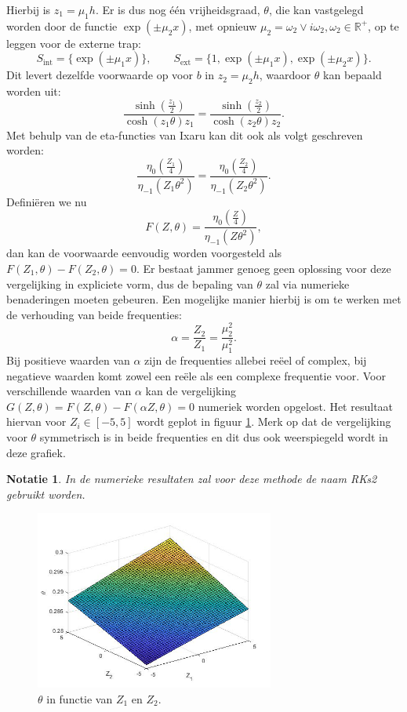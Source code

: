 \documentclass[12pt]{article}
\newtheorem{nta}[defn]{Notatie}
\begin{document}
Hierbij is \(z_1=\mu_1h\). Er is dus nog één vrijheidsgraad, \(\theta\), die kan vastgelegd worden door de functie \(\exp(\pm\mu_2x)\), met opnieuw \(\mu_2=\omega_2\vee i\omega_2,\omega_2\in\mathbb{R}^+\), op te leggen voor de externe trap:
\[S_{\textrm{int}}=\{\exp(\pm\mu_1x)\},\qquad S_{\textrm{ext}}=\{1,\exp(\pm\mu_1x),\exp(\pm\mu_2x)\}.\]
Dit levert dezelfde voorwaarde op voor \(b\) in \(z_2=\mu_2h\), waardoor \(\theta\) kan bepaald worden uit:
\[\frac{\sinh(\frac{z_1}{2})}{\cosh(z_1\theta)z_1}=\frac{\sinh(\frac{z_2}{2})}{\cosh(z_2\theta)z_2}.\]
Met behulp van de eta-functies van Ixaru kan dit ook als volgt geschreven worden:
\begin{equation} \label{eq:thetaeq}
    \frac{\eta_0(\frac{Z_1}{4})}{\eta_{-1}(Z_1\theta^2)}=\frac{\eta_0(\frac{Z_2}{4})}{\eta_{-1}(Z_2\theta^2)}.
\end{equation}
Definiëren we nu
\[F(Z,\theta)=\frac{\eta_0(\frac{Z}{4})}{\eta_{-1}(Z\theta^2)},\]
dan kan de voorwaarde eenvoudig worden voorgesteld als \(F(Z_1,\theta)-F(Z_2,\theta)=0\). Er bestaat jammer genoeg geen oplossing voor deze vergelijking in expliciete vorm, dus de bepaling van \(\theta\) zal via numerieke benaderingen moeten gebeuren. Een mogelijke manier hierbij is om te werken met de verhouding van beide frequenties:
\[\alpha=\frac{Z_2}{Z_1}=\frac{\mu_2^2}{\mu_1^2}.\]
Bij positieve waarden van \(\alpha\) zijn de frequenties allebei reëel of complex, bij negatieve waarden komt zowel een reële als een complexe frequentie voor. Voor verschillende waarden van \(\alpha\) kan de vergelijking \(G(Z,\theta)=F(Z,\theta)-F(\alpha Z,\theta)=0\) numeriek worden opgelost. Het resultaat hiervan voor \(Z_i\in[-5,5]\) wordt geplot in figuur \ref{fig:thetagraph}. Merk op dat de vergelijking voor \(\theta\) symmetrisch is in beide frequenties en dit dus ook weerspiegeld wordt in deze grafiek.
\begin{nta}
In de numerieke resultaten zal voor deze methode de naam RKs2 gebruikt worden.
\end{nta}
\begin{figure}[H]
    \centering
    \includegraphics[width=0.7\textwidth]{thetagraph.jpg}
    \caption{\(\theta\) in functie van \(Z_1\) en \(Z_2\).}
    \label{fig:thetagraph}
\end{figure}
\end{document}
